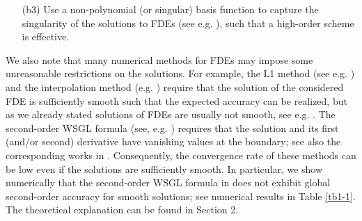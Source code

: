 \documentclass[10pt]{siamltex}
\begin{document}
\begin{itemize}
\begin{itemize}
 \item[(b3)] Use a non-polynomial (or singular) basis function to  capture the singularity
     of   the solutions to FDEs
 (see e.g. \cite{CaoHX03,ChenSW14,EsmSL11,ForMR13,JinZhou14,MaoShen16,ZayKar14b,ZengZK15,ZhangZK15}), such that
 a high-order scheme is effective.

\end{itemize}
\end{itemize}



We also note that many numerical methods  for FDEs
may impose some unreasonable restrictions on  the solutions.
For example, the L1 method (see e.g. \cite {LinXu07}) and the interpolation method
(e.g. \cite{Diethelm-B10,Sousa12}) require that the solution of the considered
FDE is sufficiently smooth such that the expected accuracy can be realized,
but as we already stated solutions of FDEs are usually not smooth, see e.g. \cite{Diethelm-B10}.
The second-order WSGL formula
(see, e.g. \cite{TianZD14,WangVong14b}) requires that the solution and its first (and/or second)
derivative have vanishing values at the boundary;  see also the corresponding works in
\cite{CelikDuman12,ChenDeng14,DingLC14a,DingLC14b,GaoSS15,ZengLLT13,ZhaoSH14,ZhouTD13}.
Consequently, the  convergence rate of these methods can be  low
even if the solutions are sufficiently smooth. In particular, we
  show numerically that the second-order
WSGL formula in \cite{TianZD14,WangVong14b}
does not exhibit global second-order  accuracy for smooth solutions;
see  numerical results in  Table \ref{tb1-1}.
The theoretical explanation can be found in Section 2.
\end{document}
